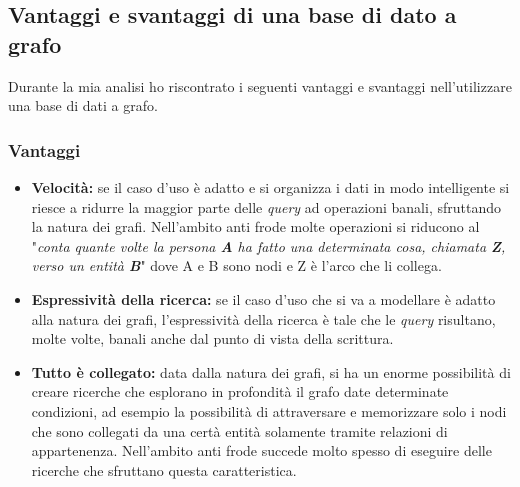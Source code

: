 \subsection{Vantaggi e svantaggi di una base di dato a grafo}
Durante la mia analisi ho riscontrato i seguenti vantaggi e svantaggi nell'utilizzare una base di dati a grafo.
\subsubsection{Vantaggi}
\begin{itemize}
\item{\textbf{Velocità:}} se il caso d'uso è adatto e si organizza i dati in modo intelligente si riesce a ridurre la maggior parte delle \textit{query} ad operazioni banali, sfruttando la natura dei grafi. Nell'ambito anti frode molte operazioni si riducono al "\textit{conta quante volte la persona \textbf{A} ha fatto una determinata cosa, chiamata \textbf{Z}, verso un entità \textbf{B}}" dove A e B sono nodi e Z è l'arco che li collega.
\item{\textbf{Espressività della ricerca:}} se il caso d'uso che si va a modellare è adatto alla natura dei grafi, l'espressività della ricerca è tale che le \textit{query} risultano, molte volte, banali anche dal punto di vista della scrittura.
\item{\textbf{Tutto è collegato:}} data dalla natura dei grafi, si ha un enorme possibilità di creare ricerche che esplorano in profondità il grafo date determinate condizioni, ad esempio la possibilità di attraversare e memorizzare solo i nodi che sono collegati da una certà entità solamente tramite relazioni di appartenenza. Nell'ambito anti frode succede molto spesso di eseguire delle ricerche che sfruttano questa caratteristica.
\end{itemize}
